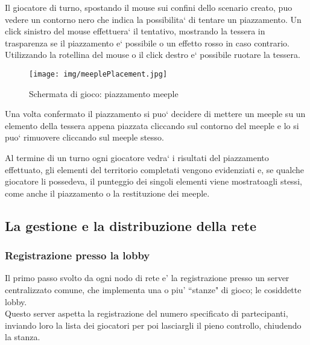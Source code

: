 Il giocatore di turno, spostando il mouse sui confini dello scenario creato, puo vedere un contorno nero che indica la possibilita` di tentare un piazzamento. Un click sinistro del mouse effettuera` il tentativo, mostrando la tessera in trasparenza se il piazzamento e` possibile o un effetto rosso in caso contrario. 
Utilizzando la rotellina del mouse o il click destro e` possibile ruotare la tessera.

\begin{figure}[htbp]
	\texttt{[image: img/meeplePlacement.jpg]}
	\caption{Schermata di gioco: piazzamento meeple}
	\label{img:gameMeeple}
\end{figure}

Una volta confermato il piazzamento si puo` decidere di mettere un meeple su un elemento della tessera appena piazzata cliccando sul contorno del meeple e lo si puo` rimuovere cliccando sul meeple stesso.

Al termine di un turno ogni giocatore vedra` i risultati del piazzamento effettuato, gli elementi del territorio completati vengono evidenziati e, se qualche giocatore li possedeva, il punteggio dei singoli elementi viene mostratoagli stessi, come anche il piazzamento o la restituzione dei meeple.

\subsection{La gestione e la distribuzione della rete}
	\subsubsection{Registrazione presso la lobby}
		Il primo passo svolto da ogni nodo di rete e' la registrazione
		presso un server centralizzato comune, che implementa una o piu'
		``stanze" di gioco; le cosiddette lobby.\\
		Questo server aspetta la registrazione del numero
		specificato di partecipanti, inviando loro la lista dei
		giocatori per poi lasciargli il pieno controllo, chiudendo la stanza.

